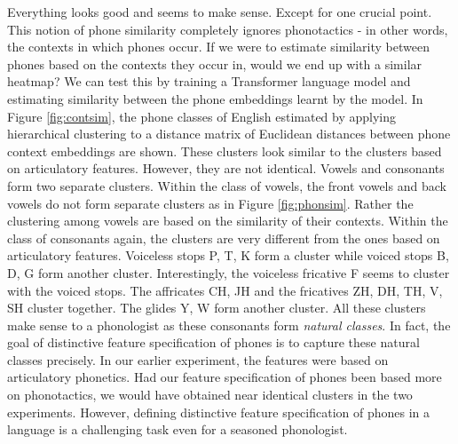 \documentclass{article}
\begin{document}
Everything looks good and seems to make sense. Except for one crucial point. This notion of phone similarity completely ignores phonotactics - in other words, the contexts in which phones occur. If we were to estimate similarity between phones based on the contexts they occur in, would we end up with a similar heatmap? We can test this by training a Transformer language model and estimating similarity between the phone embeddings learnt by the model. In Figure \ref{fig:contsim}, the phone classes of English estimated by applying hierarchical clustering to a distance matrix of Euclidean distances between phone context embeddings are shown. These clusters look similar to the clusters based on articulatory features. However, they are not identical. Vowels and consonants form two separate clusters. Within the class of vowels, the front vowels and back vowels do not form separate clusters as in Figure \ref{fig:phonsim}. Rather the clustering among vowels are based on the similarity of their contexts. Within the class of consonants again, the clusters are very different from the ones based on articulatory features. Voiceless stops P, T, K form a cluster while voiced stops B, D, G form another cluster. Interestingly, the voiceless fricative F seems to cluster with the voiced stops. The affricates CH, JH and the fricatives ZH, DH, TH, V, SH cluster together. The glides Y, W form another cluster. All these clusters make sense to a phonologist as these consonants form \textit{natural classes}. In fact, the goal of distinctive feature specification of phones is to capture these natural classes precisely. In our earlier experiment, the features were based on articulatory phonetics. Had our feature specification of phones been based more on phonotactics, we would have obtained near identical clusters in the two experiments. However, defining distinctive feature specification of phones in a language is a challenging task even for a seasoned phonologist. 
\end{document}
